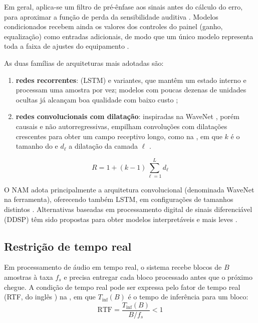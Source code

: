 \documentclass[%
  a4paper,%
  12pt,%
  fleqn,%
  english,%
  brazilian,%
]{article}
\begin{document}
Em geral, aplica-se um filtro de pré-ênfase aos sinais antes do cálculo do erro, para aproximar a função de perda da sensibilidade auditiva \cite{Wright2020loss}.
Modelos condicionados recebem ainda os valores dos controles do painel (ganho, equalização) como entradas adicionais, de modo que um único modelo representa toda a faixa de ajustes do equipamento \cite{Juvela2023}.

As duas famílias de arquiteturas mais adotadas são:
\begin{enumerate}[label = {\alph*)}]
\item \textbf{redes recorrentes}:  (LSTM) \cite{Hochreiter1997} e variantes, que mantêm um estado interno e processam uma amostra por vez; modelos com poucas dezenas de unidades ocultas já alcançam boa qualidade com baixo custo \cite{Wright2019};
\item \textbf{redes convolucionais com dilatação}: inspiradas na WaveNet \cite{Oord2016}, porém causais e não autorregressivas, empilham convoluções com dilatações crescentes para obter um campo receptivo longo, como na , em que $k$ é o tamanho do  e $d_{\ell}$ a dilatação da camada $\ell$ \cite{Damskagg2019,Steinmetz2022}.
\end{enumerate}
\begin{equation}%
\label{eq:rf}
R = 1 + (k - 1) \sum_{\ell=1}^{L} d_{\ell}
\end{equation}

O NAM adota principalmente a arquitetura convolucional (denominada WaveNet na ferramenta), oferecendo também LSTM, em configurações de tamanhos distintos \cite{Atkinson2023}.
Alternativas  baseadas em processamento digital de sinais diferenciável (DDSP) têm sido propostas para obter modelos interpretáveis e mais leves \cite{Yeh2024,Comunita2025}.

\subsection{Restrição de tempo real}%
\label{ssect:tempo-real}

Em processamento de áudio em tempo real, o sistema recebe blocos de $B$ amostras à taxa $f_s$ e precisa entregar cada bloco processado antes que o próximo chegue.
A condição de tempo real pode ser expressa pelo fator de tempo real (RTF, do inglês ) na , em que $T_{\mathrm{inf}}(B)$ é o tempo de inferência para um bloco:
\begin{equation}%
\label{eq:rtf}
\mathrm{RTF} = \frac{T_{\mathrm{inf}}(B)}{B / f_s} < 1
\end{equation}
\end{document}
